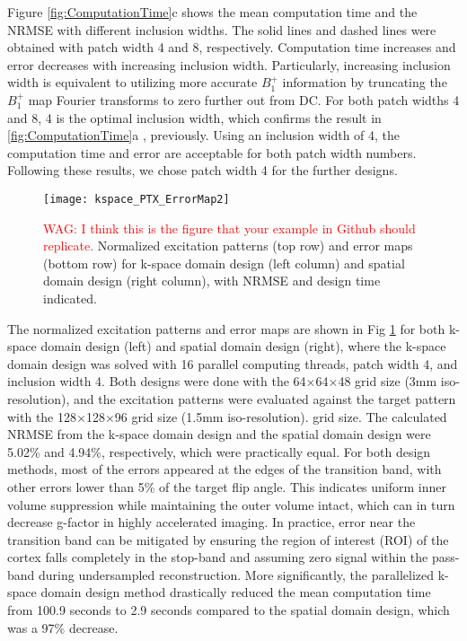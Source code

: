 Figure \ref{fig:ComputationTime}c shows the mean computation time and the NRMSE with different inclusion widths. The solid lines and dashed lines were obtained with patch width 4 and 8, respectively. Computation time increases and error decreases with increasing inclusion width. Particularly, increasing inclusion width is equivalent to utilizing more accurate $B_1^+$ information by truncating the $B_1^+$ map Fourier transforms to zero further out from DC. For both patch widths 4 and 8, 4 is the optimal inclusion width, which confirms the result in \ref{fig:ComputationTime}a , previously. Using an inclusion width of 4, the computation time and error are acceptable for both patch width numbers. Following these results,  we chose patch width 4 for the further designs.

\begin{figure}
	\centering
	\texttt{[image: kspace\_PTX\_ErrorMap2]}
	\caption{\textcolor{red}{WAG: I think this is the figure that your example in Github should replicate.}
	Normalized excitation patterns (top row) and error maps (bottom row) for k-space domain design (left column) and spatial domain design (right column), with NRMSE and design time indicated.}
	\label{fig:ErrorMap}
\end{figure}
The normalized excitation patterns and error maps are shown in Fig \ref{fig:ErrorMap} for both k-space domain design (left) and spatial domain design (right), where the k-space domain design was solved with 16 parallel computing threads, patch width 4, and inclusion width 4. 
Both designs were done with the 64$\times$64$\times$48 grid size (3mm iso-resolution), and the excitation patterns were evaluated against the target pattern with the 128$\times$128$\times$96 grid size (1.5mm iso-resolution).  grid size. 
The calculated NRMSE from the k-space domain design and the spatial domain design were 5.02\% and 4.94\%, respectively, which were practically equal. For both design methods, most of the errors appeared at the edges of the transition band, with other errors lower than 5\% of the target flip angle. This indicates uniform inner volume suppression while maintaining the outer volume intact, which can in turn decrease g-factor in highly accelerated imaging. In practice, error near the transition band can be mitigated by ensuring the region of interest (ROI) of the cortex falls completely in the stop-band and assuming zero signal within the pass-band during undersampled reconstruction. More significantly, the parallelized k-space domain design method drastically reduced the mean computation time from 100.9 seconds to 2.9 seconds compared to the spatial domain design, which was a 97\% decrease.

